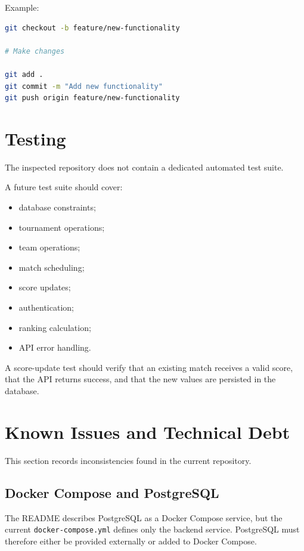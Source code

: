 \documentclass[11pt,a4paper]{article}
\begin{document}
Example:

\begin{lstlisting}[language=bash]
git checkout -b feature/new-functionality

# Make changes

git add .
git commit -m "Add new functionality"
git push origin feature/new-functionality
\end{lstlisting}

\section{Testing}

The inspected repository does not contain a dedicated automated
test suite.

A future test suite should cover:

\begin{itemize}
    \item database constraints;
    \item tournament operations;
    \item team operations;
    \item match scheduling;
    \item score updates;
    \item authentication;
    \item ranking calculation;
    \item API error handling.
\end{itemize}

A score-update test should verify that an existing match receives a
valid score, that the API returns success, and that the new values are
persisted in the database.

\section{Known Issues and Technical Debt}
\label{sec:known-issues}

This section records inconsistencies found in the current repository.

\subsection{Docker Compose and PostgreSQL}

The README describes PostgreSQL as a Docker Compose service, but the
current \texttt{docker-compose.yml} defines only the backend service.
PostgreSQL must therefore either be provided externally or added to
Docker Compose.
\end{document}
